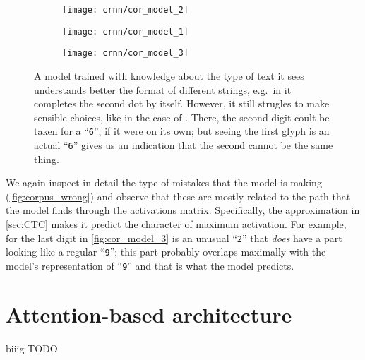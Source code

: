 			\begin{figure}
				\begin{subfigure}[b]{.3\linewidth}
					\texttt{[image: crnn/cor\_model\_2]}
					\caption{}\label{fig:cor_model_2}
				\end{subfigure}
				\begin{subfigure}[b]{.3\linewidth}
					\texttt{[image: crnn/cor\_model\_1]}
					\caption{}\label{fig:cor_model_1}
				\end{subfigure}
				\begin{subfigure}[b]{.3\linewidth}
					\texttt{[image: crnn/cor\_model\_3]}
					\caption{}\label{fig:cor_model_3}
				\end{subfigure}
				\caption[Understandably wrong predictions (2)]{A model trained with knowledge about the type of text it sees understands better the format of different strings, e.g.\ in  it completes the second dot by itself. However, it still strugles to make sensible choices, like in the case of . There, the second digit coult be taken for a ``\texttt{6}'', if it were on its own; but seeing the first glyph is an actual ``\texttt{6}'' gives us an indication that the second cannot be the same thing.}\label{fig:corpus_wrong}
			\end{figure}
			We again inspect in detail the type of mistakes that the model is making (\autoref{fig:corpus_wrong}) and observe that these are mostly related to the path that the model finds through the activations matrix. Specifically, the approximation in \autoref{sec:CTC} makes it predict the character of maximum activation. For example, for the last digit in \autoref{fig:cor_model_3} is an unusual ``\texttt{2}'' that \emph{does} have a part looking like a regular ``\texttt{9}''; this part probably overlaps maximally with the model's representation of ``\texttt{9}'' and that is what the model predicts.


\section{Attention-based architecture}\label{sec:attention}
	biiig TODO

